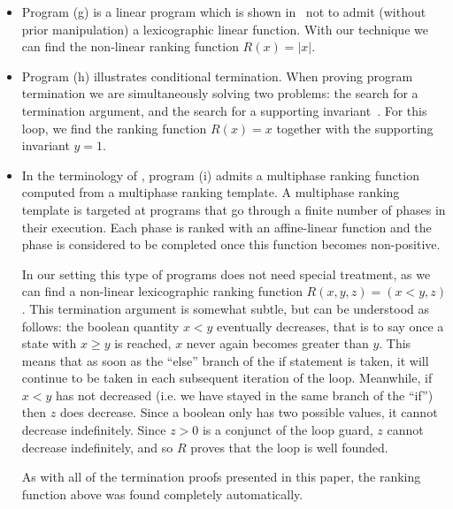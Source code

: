 \documentclass[preprint]{sigplanconf}
\theoremstyle{definition}
\begin{document}
\begin{itemize}
\item Program (g) is a linear program
which is shown in~\cite{DBLP:conf/tacas/CookSZ13} not to admit (without prior manipulation) a lexicographic linear function.
With our technique we can find the non-linear ranking function $R(x) = |x|$.

\item Program (h) illustrates conditional termination.  When proving program
termination we are simultaneously solving two problems: the search for a
termination argument, and the search for a supporting
invariant~\cite{DBLP:conf/cav/BrockschmidtCF13}.  For this loop, we find the
ranking function $R(x) = x$ together with the supporting invariant $y=1$.

\item In the terminology of \cite{DBLP:conf/tacas/LeikeH14}, program (i)
admits a multiphase ranking function computed from a multiphase ranking
template.  A multiphase ranking template is targeted at programs that go
through a finite number of phases in their execution.  Each phase is ranked
with an affine-linear function and the phase is considered to be completed
once this function becomes non-positive.

In our setting this type of programs does not need special treatment, as we
can find a non-linear lexicographic ranking function $R(x, y, z) = (x < y,
z)$.  This termination argument is somewhat subtle, but can be understood as
follows: the boolean quantity $x < y$ eventually decreases, that is to say
once a state with $x \geq y$ is reached, $x$ never again becomes greater
than $y$.  This means that as soon as the ``else'' branch of the if
statement is taken, it will continue to be taken in each subsequent
iteration of the loop.  Meanwhile, if $x < y$ has not decreased (i.e.  we
have stayed in the same branch of the ``if'') then $z$ does decrease.  Since
a boolean only has two possible values, it cannot decrease indefinitely. 
Since $z > 0$ is a conjunct of the loop guard, $z$ cannot decrease
indefinitely, and so $R$ proves that the loop is well founded.

As with all of the termination proofs presented in this paper, the ranking
function above was found completely automatically.

\iffalse
\item Program (j) illustrates a nested loop.  This construction can cause difficulties for provers based on
enumerating lassos
\fi
\end{itemize}
\end{document}
